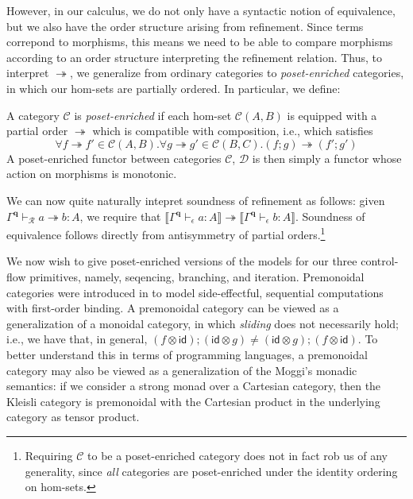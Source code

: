 \documentclass[acmsmall,screen,anonymous,review]{acmart}
\newcommand{\mc}[1]{\ensuremath{\mathcal{#1}}}
\newcommand{\mb}[1]{\ensuremath{\mathbf{#1}}}
\newcommand{\ms}[1]{\ensuremath{\mathsf{#1}}}
\newcommand{\hasty}[4]{#1 \vdash_{#2} #3: {#4}}
\newcommand{\tref}{\twoheadrightarrow}
\newcommand{\cref}{\twoheadrightarrow}
\newcommand{\tmle}[5]{#1 \vdash_{#2} #3 \tref #4 : {#5}}
\newcommand{\dnt}[1]{\llbracket{#1}\rrbracket}
\begin{document}
However, in our calculus, we do not only have a syntactic notion of equivalence, but we also have
the order structure arising from refinement. Since terms correpond to morphisms, this means we need
to be able to compare morphisms according to an order structure interpreting the refinement
relation. Thus, to interpret $\tref$, we generalize from ordinary categories to
\emph{poset-enriched} categories, in which our hom-sets are partially ordered. In particular, we
define:

\begin{definition}
  A category $\mc{C}$ is \emph{poset-enriched} if each hom-set $\mc{C}(A, B)$ is equipped with a
  partial order $\cref$ which is compatible with composition, i.e., which satisfies
  $$
  \forall f \cref f' \in \mc{C}(A, B) . \forall g \tref g' \in \mc{C}(B, C) . 
    (f ; g) \tref (f' ; g')
  $$
  A poset-enriched functor between categories $\mc{C}$, $\mc{D}$ is then simply a functor whose
  action on morphisms is monotonic.
\end{definition}

We can now quite naturally intepret soundness of refinement as follows: given
$\tmle{\Gamma^{\mb{q}}}{\mc{R}}{a}{b}{A}$, we require that
$\dnt{\hasty{\Gamma^{\mb{q}}}{\epsilon}{a}{A}} \cref \dnt{\hasty{\Gamma^{\mb{q}}}{\epsilon}{b}{A}}$.
Soundness of equivalence follows directly from antisymmetry of partial orders.\footnote{Requiring
$\mc{C}$ to be a poset-enriched category does not in fact rob us of any generality, since \emph{all}
categories are poset-enriched under the identity ordering on hom-sets.}

We now wish to give poset-enriched versions of the models for our three control-flow primitives,
namely, seqencing, branching, and iteration. Premonoidal categories were introduced in
\citet{power-premonoidal-97} to model side-effectful, sequential computations with first-order
binding. A premonoidal category can be viewed as a generalization of a monoidal category, in which
\emph{sliding} does not necessarily hold; i.e., we have that, in general,
$
(f \otimes \ms{id}) ; (\ms{id} \otimes g) \neq
(\ms{id} \otimes g) ; (f \otimes \ms{id})
$.
To better understand this in terms of programming languages, a premonoidal category may also be
viewed as a generalization of the Moggi's \cite{moggi-91-monad} monadic semantics: if we consider a
strong monad over a Cartesian category, then the Kleisli category is premonoidal with the Cartesian
product in the underlying category as tensor product. 
\end{document}
